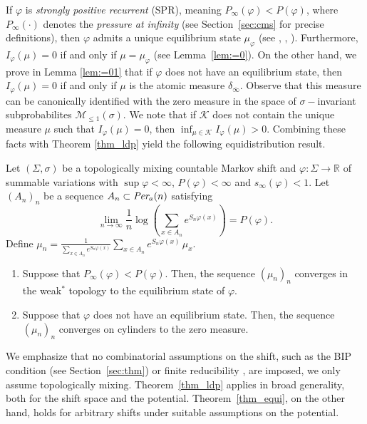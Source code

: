 \documentclass[letterpaper,11pt]{amsart}
\numberwithin{equation}{section}     %
\newcommand{\K}{\mathcal{K}}
\newcommand{\M}{\mathcal{M}}
\newcommand{\R}{\mathbb{R}}
\def\phi{\varphi}
\def\R{{\mathbb R}}
\def\M{{\mathcal M}}
\def\le{\leqslant}
\def\M{\mathcal{M}}
\begin{document}
If $\phi$ is \emph{strongly positive recurrent} (SPR), meaning $P_\infty(\phi)<P(\phi)$, where $P_\infty(\cdot)$ denotes the \emph{pressure at infinity} (see Section~\ref{sec:cms} for precise definitions), then $\phi$ admits a unique equilibrium state $\mu_\phi$ (see \cite[Theorem 3]{sa2}, \cite[Theorem 1.1]{bs}, \cite[Theorem 1.4]{v}).  Furthermore, $I_\phi(\mu)=0$ if and only if $\mu=\mu_\phi$ (see Lemma~\ref{lem:=0}). On the other hand, we prove in Lemma \ref{lem:=01} that if $\phi$ does not have an equilibrium state, then $I_\phi(\mu)=0$  if and only if $\mu$ is the atomic measure $\delta_{\overline{\infty}}$. Observe that this measure can be canonically identified with the zero measure in the space of $\sigma-$invariant subprobabilites $\M_{\le 1}(\sigma)$.  We note that if $\K$  does not contain the unique measure $\mu$ such that $I_\phi(\mu)=0$, then $\inf_{\mu\in \K} I_\phi(\mu)>0$. Combining these facts with Theorem \ref{thm_ldp} yield the following equidistribution result.

\begin{theorem}\label{thm_equi}
Let $(\Sigma,\sigma)$  be a topologically mixing countable Markov shift and  $\phi:\Sigma\to\R$ of summable variations with $\sup\phi<\infty$, $P(\phi)<\infty$ and $s_\infty(\phi)<1$.  Let $(A_n)_n$ be a sequence $A_n\subset \emph{Per}_a(n)$ satisfying
$$\lim_{n\to\infty}\frac{1}{n}\log \left(\sum_{x\in A_n} e^{S_n\phi(x)}\right)=P(\phi).$$
Define $\mu_n=\frac{1}{\sum_{x\in A_n} e^{S_n\phi(x)}}\sum_{x\in A_n} e^{S_n\phi(x)}\,\mu_x.$
\begin{enumerate}
    \item Suppose that  $P_\infty(\phi)<P(\phi)$. Then, the sequence $(\mu_n)_n$ converges in the weak$^*$ topology to the equilibrium state of $\phi$. 
    \item Suppose that $\phi$ does not have an equilibrium state.  Then, the sequence $(\mu_n)_n$ converges on cylinders to the zero measure.
\end{enumerate}




\end{theorem}


We emphasize that no combinatorial assumptions on the shift, such as the BIP condition (see Section~\ref{sec:thm}) or finite reducibility \cite{mubook}, are imposed, we only assume topologically mixing. Theorem~\ref{thm_ldp} applies in broad generality, both for the shift space and the potential. Theorem~\ref{thm_equi}, on the other hand,  holds for arbitrary shifts under suitable assumptions on the potential.
\end{document}
